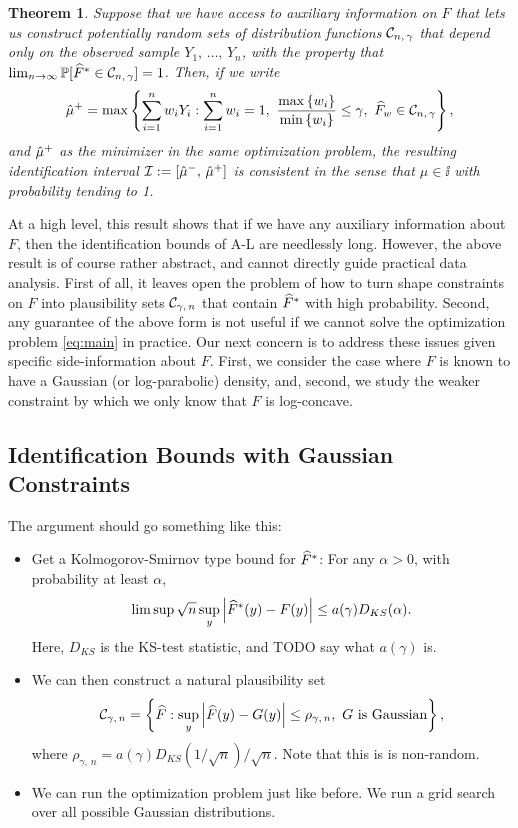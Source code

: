 \documentclass{article}
\theoremstyle{plain}
\newtheorem{theo}[prop]{Theorem}
\theoremstyle{definition}
\theoremstyle{remark}
\begin{document}
\begin{theo}
\label{theo:main}
Suppose that we have access to auxiliary information on $F$ that lets us construct
potentially random sets of distribution functions $\mathcal{C}_{n, \, \gamma}$ that
depend only on the observed sample $Y_1, \, \ldots, \, Y_n$, with the property that
$\lim_{n \rightarrow \infty} \mathbb{P}[\widehat{F}^* \in \mathcal{C}_{n, \, \gamma}] = 1$.
Then, if we write
\begin{equation}
\label{eq:main}
\hmu^+ = \max\cb{\sum_{i = 1}^n w_i Y_i : \sum_{i = 1}^n w_i = 1, \ \frac{\max\cb{w_i}}{\min\cb{w_i}} \leq \gamma, \ \hF_w \in \cset_{n, \, \gamma}},
\end{equation}
and $\hat{\mu}^+$ as the minimizer in the same optimization problem,
the resulting identification interval $\mathcal{I} := [\hat{\mu}^-,\, \hat{\mu}^+]$ is
consistent in the sense that $\mu \in \ii$ with probability tending to 1.
\end{theo}

At a high level, this result shows that if we have any auxiliary information about $F$, then
the identification bounds of A-L are needlessly long.
However, the above result is of course rather abstract, and cannot directly guide practical data
analysis. First of all, it leaves open the problem of how to turn shape constraints on $F$
into plausibility sets $\mathcal{C}_{\gamma, \, n}$ that contain $\widehat{F}^*$ with high probability.
Second, any guarantee of the above form is not useful if we cannot solve the optimization
problem \eqref{eq:main} in practice.
Our next concern is to address these issues given specific side-information about $F$.
First, we consider the case where $F$ is known to have a Gaussian (or log-parabolic) density,
and, second, we study the weaker constraint by which we only know that $F$ is log-concave.

\subsection{Identification Bounds with Gaussian Constraints}

The argument should go something like this:
\begin{itemize}
\item Get a Kolmogorov-Smirnov type bound for $\widehat{F}^*$: For any $\alpha > 0$,
with probability at least $\alpha$,
$$ \limsup \sqrt{n} \sup_{y} \left\lvert\widehat{F}^*(y) - F(y)\right\rvert \leq a(\gamma) D_{KS}(\alpha). $$
Here, $D_{KS}$ is the KS-test statistic, and TODO say what $a(\gamma)$ is.
\item We can then construct a natural plausibility set
$$ \mathcal{C}_{\gamma, \, n} = \left\{\widehat{F} : \sup_{y} \left\lvert\widehat{F}(y) - G(y)\right\rvert \leq \rho_{\gamma,\, n}, \ G \text{ is Gaussian}\right\}, $$
where $\rho_{\gamma, \, n} = a(\gamma) D_{KS}(1/\sqrt{n})/\sqrt{n}$. Note that this is
is non-random.
\item We can run the optimization problem just like before. We run a grid search over all
possible Gaussian distributions.
\end{itemize}
\end{document}
